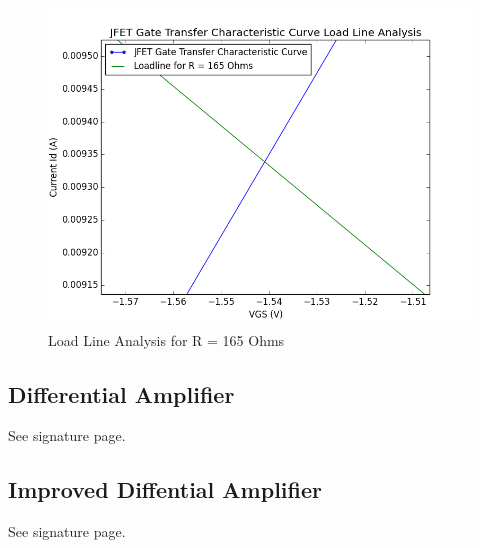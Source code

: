 \documentclass{article}
\begin{document}
    \begin{figure}[H]
        \centering
        \includegraphics[scale = 0.5]{5_4b.png}
        \caption{Load Line Analysis for R = 165 Ohms}
        \label{fig:my_label}
    \end{figure}
\subsection{Differential Amplifier}
    See signature page.
\subsection{Improved Diffential Amplifier}
    See signature page.
\end{document}
